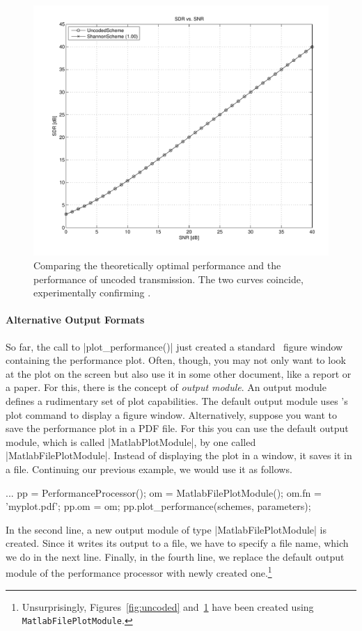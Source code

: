 \begin{figure}
  \begin{center}
    \includegraphics[width=\textwidth]{figures/matlab/ex_shannonscheme.pdf}
  \end{center}
  \caption{Comparing the theoretically optimal performance and the performance
  of uncoded transmission. The two curves coincide, experimentally confirming
  .}
  \label{fig:shannonscheme}
\end{figure}

\paragraph{Alternative Output Formats}
So far, the call to |plot_performance()| just created a standard \matlab\ figure
window containing the performance plot. Often, though, you may not only want to
look at the plot on the screen but also use it in some other document, like a
report or a paper. For this, there is the concept of \emph{output module}. An
output module defines a rudimentary set of plot capabilities. The default output
module uses \matlab's plot command to display a figure window. Alternatively,
suppose you want to save the performance plot in a PDF file. For this you can
use the default output module, which is called |MatlabPlotModule|, by one called
|MatlabFilePlotModule|. Instead of displaying the plot in a window, it saves it
in a file. Continuing our previous example, we would use it as follows.
\begin{Code}
  ...  %
  pp = PerformanceProcessor();
  om = MatlabFilePlotModule();
  om.fn = 'myplot.pdf';
  pp.om = om;
  pp.plot_performance(schemes, parameters);  %
\end{Code}
In the second line, a new output module of type |MatlabFilePlotModule| is
created. Since it writes its output to a file, we have to specify a file name,
which we do in the next line. Finally, in the fourth line, we replace the
default output module of the performance processor with newly created
one.\footnote{Unsurprisingly, Figures~\ref{fig:uncoded}
and~\ref{fig:shannonscheme} have been created using
\Verb+MatlabFilePlotModule+.}

